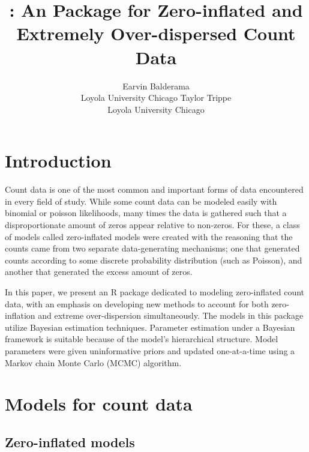 \documentclass[article]{jss}
\author{Earvin Balderama\\Loyola University Chicago \And 
        Taylor Trippe\\Loyola University Chicago}
\title{\pkg{hurdlr}: An \proglang{R} Package for Zero-inflated and Extremely Over-dispersed Count Data}
\begin{document}




\section{Introduction}

Count data is one of the most common and important forms of data encountered in every field of study. While some count data can be modeled easily with binomial or poisson likelihoods, many times the data is gathered such that a disproportionate amount of zeros appear relative to non-zeros. For these, a class of models called zero-inflated models were created with the reasoning that the counts came from two separate data-generating mechanisms; one that generated counts according to some discrete probability distribution (such as Poisson), and another that generated the excess amount of zeros. 

In this paper, we present an R package dedicated to modeling zero-inflated count data, with an emphasis on developing new methods to account for both zero-inflation and extreme over-dispersion simultaneously. The models in this package utilize Bayesian estimation techniques. Parameter estimation under a Bayesian framework is suitable because of the model's hierarchical structure. Model parameters were given uninformative priors and updated one-at-a-time using a Markov chain Monte Carlo (MCMC) algorithm.



\section{Models for count data}


\subsection{Zero-inflated models}
\end{document}
